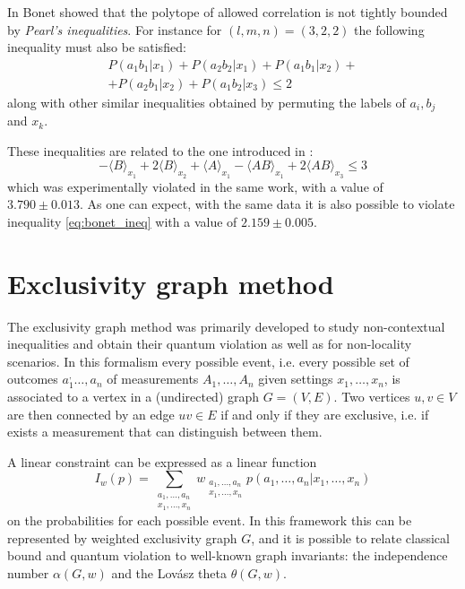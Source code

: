 \documentclass[
    nofootinbin,
    floatfix,
    amsfonts,
    twocolumn, 
    aps, 
    prl]{revtex4-1}
\newcommand{\avg}[1]{\langle#1\rangle}
\begin{document}
In \cite{bonet2001} Bonet showed that the polytope of allowed
correlation is not tightly bounded by \emph{Pearl's inequalities}.
For instance for $(l,m,n) = (3,2,2)$ the following inequality must also be satisfied:
\begin{multline}
    P(a_1 b_1 | x_1) + P(a_2 b_2 | x_1) + 
    P(a_1 b_1 | x_2) +\\+ P(a_2 b_1 | x_2) + 
    P(a_1 b_2 | x_3) \le 2
    \label{eq:bonet_ineq}
\end{multline}
along with other similar inequalities obtained by permuting the labels of
$a_i,b_j$ and $x_k$.


These inequalities are related to the one introduced in \cite{chaves2018}:
\begin{equation}
    -\avg{B}_{x_1} + 2 \avg{B}_{x_2} + \avg{A}_{x_1} - \avg{AB}_{x_1} +
    2\avg{AB}_{x_3} \le 3  
    \label{eq:rafael_ineq}
\end{equation}
which was experimentally violated in the same work, with a value of $3.790 \pm 0.013$.
As one can expect, with the same data it is also possible to violate inequality
\eqref{eq:bonet_ineq} with a value of $2.159 \pm 0.005$.

\section*{Exclusivity graph method}

The exclusivity graph method was primarily developed to study
non-contextual inequalities and obtain their quantum violation %
\cite{cabello2014} as well as for non-locality scenarios. %
In this formalism every possible event, i.e. every possible set of outcomes
$a_1^,\ldots, a_n$ of measurements $A_1,\ldots,A_n$ given settings
$x_1,\ldots,x_n$, is associated to a vertex in a (undirected) graph $G = (V, E)$.  
Two vertices $u, v \in V$ are then connected by an edge $uv \in E$ if and only
if they are exclusive, i.e.  if exists a measurement that can distinguish
between them. %

A linear constraint can be expressed as a linear function 
\begin{equation}
    I_w(p) = \sum_{\substack{a_1,\ldots,a_n\\x_1,\ldots,x_n}}
w_{\substack{a_1,\ldots,a_n\\x_1,\ldots,x_n}} p(a_1,\ldots,a_n|x_1,\ldots,x_n)
\end{equation}
 on the probabilities for each possible event.
In this framework this can be represented by weighted exclusivity graph $G$, and it
is possible to relate classical bound and quantum violation to well-known graph
invariants: the independence number $\alpha(G, w)$ and the Lovász theta
$\theta(G, w)$.
\end{document}
